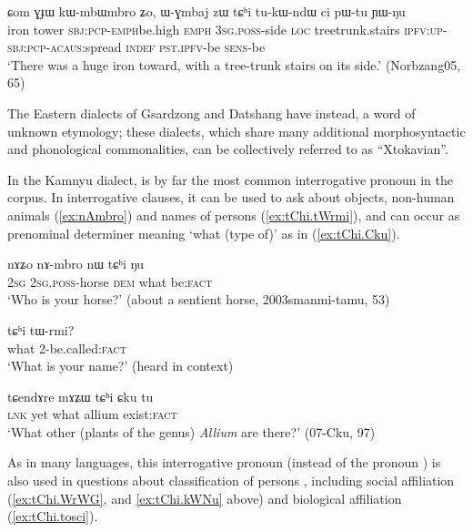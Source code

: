 \begin{exe}
\ex \label{ex:tChi.tukWndW}
\gll ɕom ɣɟɯ kɯ-mbɯ\redp{}mbro ʑo,  ɯ-ɣmbaj zɯ tɕʰi tu-kɯ-ndɯ ci pɯ-tu ɲɯ-ŋu \\
iron tower \textsc{sbj}:\textsc{pcp}-\textsc{emph}\redp{}be.high \textsc{emph} \textsc{3sg}.\textsc{poss}-side \textsc{loc} treetrunk.stairs \textsc{ipfv}:\textsc{up}-\textsc{sbj}:\textsc{pcp}-\textsc{acaus}:spread \textsc{indef} \textsc{pst}.\textsc{ipfv}-be \textsc{sens}-be \\
\glt `There was a huge iron toward, with a tree-trunk stairs on its side.' (Norbzang05, 65)
\end{exe}  

The Eastern dialects of Gsardzong and Datshang have  instead, a word of unknown etymology; these dialects, which share many additional morphosyntactic and phonological commonalities, can be collectively referred to as ``Xtokavian''.

In the Kamnyu dialect,  is by far the most common interrogative pronoun in the corpus. In interrogative clauses, it can be used to ask about objects, non-human animals (\ref{ex:nAmbro}) and names of persons (\ref{ex:tChi.tWrmi}), and can occur as prenominal determiner meaning `what (type of)' as in (\ref{ex:tChi.Cku}).

\begin{exe}
\ex \label{ex:nAmbro}
\gll nɤʑo nɤ-mbro nɯ tɕʰi ŋu \\
\textsc{2sg} \textsc{2sg}.\textsc{poss}-horse \textsc{dem} what be:\textsc{fact} \\
\glt `Who is your horse?' (about a sentient horse, 2003smanmi-tamu, 53)
\end{exe}  

\begin{exe}
\ex \label{ex:tChi.tWrmi}
\gll tɕʰi tɯ-rmi? \\
what 2-be.called:\textsc{fact} \\
\glt `What is your name?' (heard in context)
\end{exe}    

\begin{exe}
\ex \label{ex:tChi.Cku}
\gll  tɕendɤre mɤʑɯ tɕʰi ɕku tu \\
\textsc{lnk} yet what allium exist:\textsc{fact} \\
\glt `What other (plants of the genus) \textit{Allium} are there?' (07-Cku, 97)
\end{exe}   

As in many languages, this interrogative pronoun (instead of the pronoun ) is also used in questions about classification of persons \citep{idiatov07nonselective}, including social affiliation (\ref{ex:tChi.WrWG}, and \ref{ex:tChi.kWNu} above) and biological affiliation (\ref{ex:tChi.tosci}).

